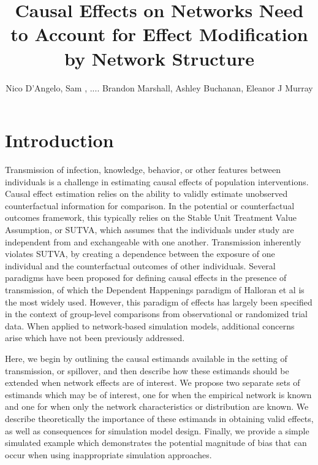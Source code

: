 \documentclass{article}
\title{Causal Effects on Networks Need to Account for Effect Modification by Network Structure}
\author{Nico D'Angelo, Sam , .... Brandon Marshall,  Ashley Buchanan,  Eleanor J Murray }
\date{}
\theoremstyle{definition}
\begin{document}
\maketitle

\section{Introduction}
Transmission of infection, knowledge, behavior, or other features between individuals is a challenge in estimating causal effects of population interventions. Causal effect estimation relies on the ability to validly estimate unobserved counterfactual information for comparison. In the potential or counterfactual outcomes framework, this typically relies on the Stable Unit Treatment Value Assumption, or SUTVA, which assumes that the individuals under study are independent from and exchangeable with one another. Transmission inherently violates SUTVA, by creating a dependence between the exposure of one individual and the counterfactual outcomes of other individuals. Several paradigms have been proposed for defining causal effects in the presence of transmission, of which the Dependent Happenings paradigm of Halloran et al  \cite{halloran_study_1991} is the most widely used. However, this paradigm of effects has largely been specified in the context of group-level comparisons from observational or randomized trial data. When applied to network-based simulation models, additional concerns arise which have not been previously addressed. 

Here, we begin by outlining the causal estimands available in the setting of transmission, or spillover, and then describe how these estimands should be extended when network effects are of interest. We propose two separate sets of estimands which may be of interest, one for when the empirical network is known and one for when only the network characteristics or distribution are known. We describe theoretically the importance of these estimands in obtaining valid effects, as well as consequences for simulation model design. Finally, we provide a simple simulated example which demonstrates the potential magnitude of bias that can occur when using inappropriate simulation approaches.
\end{document}
